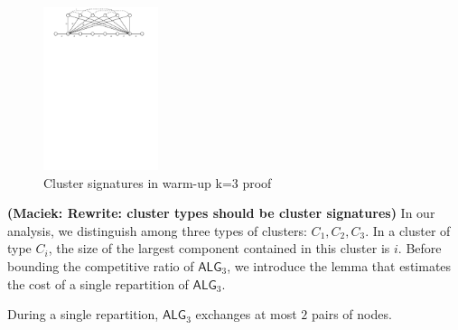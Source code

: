 \documentclass[manuscript,screen=true, review, anonymous]{acmart}
\newcommand{\TAlg}{{\ensuremath{\textsf{ALG}_{3}}}\xspace}
\newcommand\maciek[1]{\color{brown}\textbf{(Maciek: #1)}\color{black}}
\begin{document}
\begin{figure}[H]
	\centering
	\includegraphics[width=0.3\textwidth]{figs/substitute}
	\caption{Cluster signatures in warm-up k=3 proof}
\end{figure}

\maciek{Rewrite: cluster types should be cluster signatures}
In our analysis, we distinguish among three types of clusters: $C_1, C_2, C_3$. In a cluster of type $C_i$, the size of the largest component contained in this cluster is $i$.
Before bounding the competitive ratio of \TAlg, we introduce the lemma that estimates the cost of a single repartition of \TAlg.

\begin{lemma}
	\label{lem:1req}
	During a single repartition, \TAlg exchanges at most $2$ pairs of nodes.
\end{lemma}
\end{document}
